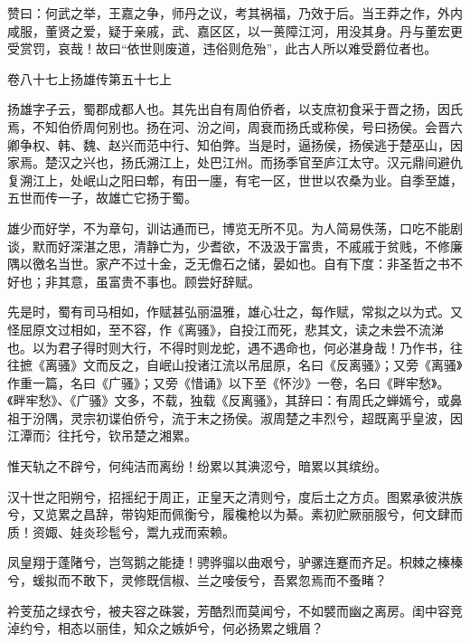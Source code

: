 \documentclass[12pt,UTF8]{ctexbook}
\begin{document}
赞曰：何武之举，王嘉之争，师丹之议，考其祸福，乃效于后。当王莽之作，外内咸服，董贤之爱，疑于亲戚，武、嘉区区，以一蒉障江河，用没其身。丹与董宏更受赏罚，哀哉！故曰“依世则废道，违俗则危殆”，此古人所以难受爵位者也。





卷八十七上扬雄传第五十七上



扬雄字子云，蜀郡成都人也。其先出自有周伯侨者，以支庶初食采于晋之扬，因氏焉，不知伯侨周何别也。扬在河、汾之间，周衰而扬氏或称侯，号曰扬侯。会晋六卿争权、韩、魏、赵兴而范中行、知伯弊。当是时，逼扬侯，扬侯逃于楚巫山，因家焉。楚汉之兴也，扬氏溯江上，处巴江州。而扬季官至庐江太守。汉元鼎间避仇复溯江上，处岷山之阳曰郫，有田一廛，有宅一区，世世以农桑为业。自季至雄，五世而传一子，故雄亡它扬于蜀。



雄少而好学，不为章句，训诂通而已，博览无所不见。为人简易佚荡，口吃不能剧谈，默而好深湛之思，清静亡为，少耆欲，不汲汲于富贵，不戚戚于贫贱，不修廉隅以徼名当世。家产不过十金，乏无儋石之储，晏如也。自有下度：非圣哲之书不好也；非其意，虽富贵不事也。顾尝好辞赋。



先是时，蜀有司马相如，作赋甚弘丽温雅，雄心壮之，每作赋，常拟之以为式。又怪屈原文过相如，至不容，作《离骚》，自投江而死，悲其文，读之未尝不流涕也。以为君子得时则大行，不得时则龙蛇，遇不遇命也，何必湛身哉！乃作书，往往摭《离骚》文而反之，自岷山投诸江流以吊屈原，名曰《反离骚》；又旁《离骚》作重一篇，名曰《广骚》；又旁《惜诵》以下至《怀沙》一卷，名曰《畔牢愁》。《畔牢愁》、《广骚》文多，不载，独载《反离骚》，其辞曰：有周氏之蝉嫣兮，或鼻祖于汾隅，灵宗初谍伯侨兮，流于末之扬侯。淑周楚之丰烈兮，超既离乎皇波，因江潭而氵往托兮，钦吊楚之湘累。



惟天轨之不辟兮，何纯洁而离纷！纷累以其淟涊兮，暗累以其缤纷。



汉十世之阳朔兮，招摇纪于周正，正皇天之清则兮，度后土之方贞。图累承彼洪族兮，又览累之昌辞，带钩矩而佩衡兮，履欃枪以为綦。素初贮厥丽服兮，何文肆而质！资娵、娃炎珍髢兮，鬻九戎而索赖。



凤皇翔于蓬陼兮，岂驾鹅之能捷！骋骅骝以曲艰兮，驴骡连蹇而齐足。枳棘之榛榛兮，蝯拟而不敢下，灵修既信椒、兰之唼佞兮，吾累忽焉而不蚤睹？



衿芰茄之绿衣兮，被夫容之硃裳，芳酷烈而莫闻兮，不如襞而幽之离房。闺中容竞淖约兮，相态以丽佳，知众之嫉妒兮，何必扬累之蛾眉？
\end{document}

